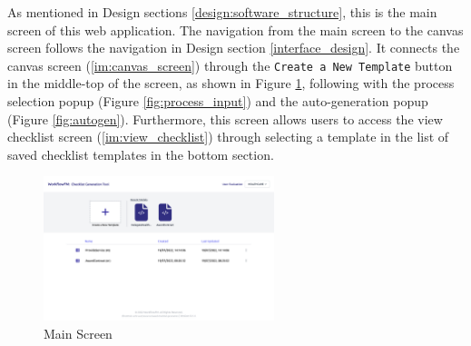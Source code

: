 As mentioned in Design sections \ref{design:software_structure}, this is the main screen of this web application. The navigation from the main screen to the canvas screen follows the navigation in Design section \ref{interface_design}.
It connects the canvas screen (\ref{im:canvas_screen}) through the \verb!Create a New Template! button in the middle-top of the screen, as shown in Figure \ref{fig:main_screen}, following with the process selection popup (Figure \ref{fig:process_input}) and the auto-generation popup (Figure \ref{fig:autogen}).
Furthermore, this screen allows users to access the view checklist screen (\ref{im:view_checklist}) through selecting a template in the list of saved checklist templates in the bottom section.

\begin{figure}[ht!]
    \centering
    \includegraphics[width=0.6\textwidth]{overleaf/images/screens/main_screen.png}
    \caption{Main Screen}
    \label{fig:main_screen}
\end{figure}


